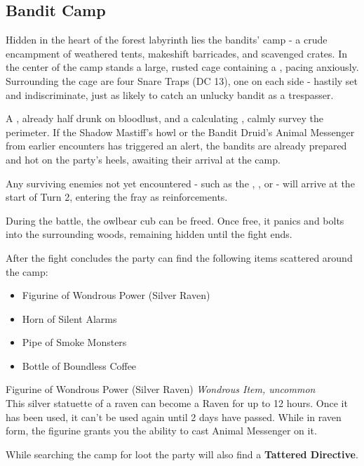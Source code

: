 \subsection*{ Bandit Camp}
{\entryfont
Hidden in the heart of the forest labyrinth lies the bandits' camp - a crude encampment of weathered tents, makeshift barricades, and scavenged crates. In the center of the camp stands a large, rusted cage containing a \hyperref[monster:OwlbearCub]{}, pacing anxiously. Surrounding the cage are four Snare Traps (DC 13), one on each side - hastily set and indiscriminate, just as likely to catch an unlucky bandit as a trespasser.

A \hyperref[monster:BanditBerserker]{}, already half drunk on bloodlust, and a calculating \hyperref[monster:BanditCaptain]{}, calmly survey the perimeter. If the Shadow Mastiff's howl or the Bandit Druid's Animal Messenger from earlier encounters has triggered an alert, the bandits are already prepared and hot on the party's heels, awaiting their arrival at the camp.

Any surviving enemies not yet encountered - such as the \hyperref[monster:BanditArcher]{}, \hyperref[monster:BanditDruid]{}, or \hyperref[monster:ShadowMastiff]{} - will arrive at the start of Turn 2, entering the fray as reinforcements.

During the battle, the owlbear cub can be freed. Once free, it panics and bolts into the surrounding woods, remaining hidden until the fight ends.

After the fight concludes the party can find the following items scattered around the camp:
\begin{itemize}
	\item Figurine of Wondrous Power (Silver Raven)
	\item Horn of Silent Alarms
	\item Pipe of Smoke Monsters
	\item Bottle of Boundless Coffee
\end{itemize}}
\begingroup
	\DndSetThemeColor[PhbLightGreen]
	\begin{DndComment}{Figurine of Wondrous Power (Silver Raven)}
		\textit{Wondrous Item, uncommon}\\
		This silver statuette of a raven can become a Raven for up to 12 hours. Once it has been used, it can't be used again until 2 days have passed. While in raven form, the figurine grants you the ability to cast Animal Messenger on it.
	\end{DndComment}
\endgroup
{\entryfont\noindent While searching the camp for loot the party will also find a \textbf{Tattered Directive}.}
